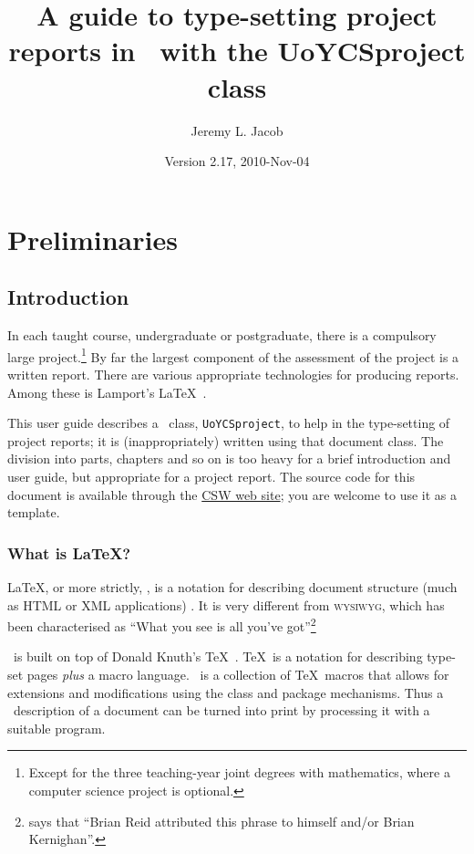 \documentclass[authoryearcitations]{UoYCSproject}
\author{Jeremy L. Jacob}
\title{A guide to type-setting project reports in \LaTeXe\ with the
  \textsf{UoYCSproject} class}
\date{Version 2.17, 2010-Nov-04}
\begin{document}
\maketitle
\listoffigures
\listoftables
\renewcommand*{\lstlistlistingname}{List of Listings}
\lstlistoflistings

\cleardoublepage
\part{Preliminaries}
\label{sec:start}
\thispagestyle{empty}\cleardoublepage

\chapter{Introduction}
\label{cha:Introduction}

In each taught course, undergraduate or postgraduate, there is a
compulsory large project.\footnote{Except for the three teaching-year
  joint degrees with mathematics, where a computer science project is
  optional.}  By far the largest component of the assessment of the
project is a written report.  There are various appropriate
technologies for producing reports.  Among these is Lamport's \LaTeX\ 
\citep{Lamport1994}.

This user guide describes a \LaTeXe\ class, \lstinline|UoYCSproject|,
to help in the type-setting of project reports; it is
(inappropriately) written using that document class.  The division
into parts, chapters and so on is too heavy for a brief introduction
and user guide, but appropriate for a project report.  The source code
for this document is available through the
\href{http://www-course.cs.york.ac.uk/csw/}{CSW web site}; you are
welcome to use it as a template.

\section{What is \LaTeX?}
\label{sec:whatislatex}

\LaTeX, or more strictly, \LaTeXe, is a notation for describing
document structure (much as HTML or XML applications)
\citep{Lamport1994}.  It is very different from \textsc{wysiwyg},
which has been characterised as ``What you see is all you've
got''\footnote{\citet[p7, Footnote~1]{Lamport1994} says that ``Brian
  Reid attributed this phrase to himself and/or Brian Kernighan''.}

\LaTeXe\ is built on top of Donald Knuth's \TeX\ \citep{Knuth1984}.
\TeX\ is a notation for describing type-set pages \emph{plus} a macro
language.  \LaTeXe\ is a collection of \TeX\ macros that allows for
extensions and modifications using the class and package mechanisms.
Thus a \LaTeXe\ description of a document can be turned into print by
processing it with a suitable program.
\end{document}
